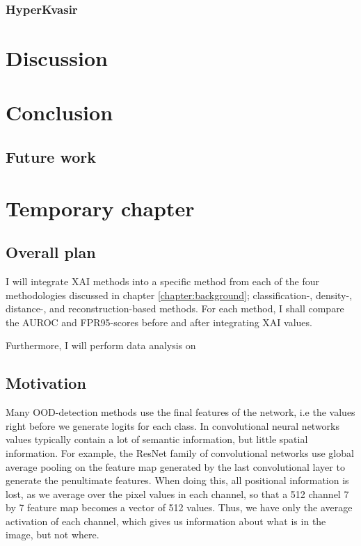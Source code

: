 \documentclass[UKenglish]{uiomasterthesis} %
\theoremstyle{definition}
\begin{document}
\subsection{HyperKvasir}

\chapter{Discussion} \label{chapter:discussion}

\chapter{Conclusion} \label{chapter:conclusion}

\section{Future work}

\chapter{Temporary chapter} \label{chapter:newmethod}


\section{Overall plan}

I will integrate XAI methods into a specific method from each of the four methodologies discussed in chapter \ref{chapter:background}; classification-, density-, distance-, and reconstruction-based methods. For each method, I shall compare the AUROC and FPR95-scores before and after integrating XAI values.

Furthermore, I will perform data analysis on 

\section{Motivation} \label{chapter:tempmotivation}

Many OOD-detection methods use the final features of the network, i.e the values right before we generate logits for each class. In convolutional neural networks values typically contain a lot of semantic information, but little spatial information. For example, the ResNet family of convolutional networks use global average pooling on the feature map generated by the last convolutional layer to generate the penultimate features. When doing this, all positional information is lost, as we average over the pixel values in each channel, so that a 512 channel 7 by 7 feature map becomes a vector of 512 values. Thus, we have only the average activation of each channel, which gives us information about what is in the image, but not where.
\end{document}
